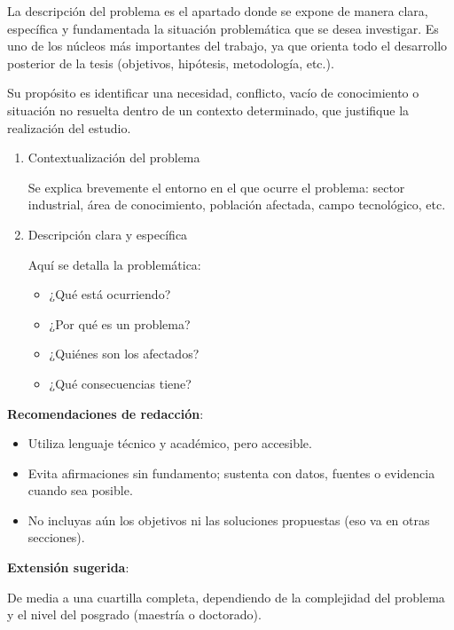 La descripción del problema es el apartado donde se expone de manera clara, específica y fundamentada la situación problemática que se desea investigar. Es uno de los núcleos más importantes del trabajo, ya que orienta todo el desarrollo posterior de la tesis (objetivos, hipótesis, metodología, etc.).

Su propósito es identificar una necesidad, conflicto, vacío de conocimiento o situación no resuelta dentro de un contexto determinado, que justifique la realización del estudio.

\begin{enumerate}
    \item Contextualización del problema

    Se explica brevemente el entorno en el que ocurre el problema: sector industrial, área de conocimiento, población afectada, campo tecnológico, etc.

    \item Descripción clara y específica
    
    Aquí se detalla la problemática:

    \begin{itemize}
        \item ¿Qué está ocurriendo?
        \item ¿Por qué es un problema?
        \item ¿Quiénes son los afectados?
        \item ¿Qué consecuencias tiene?
    \end{itemize}
\end{enumerate}

\textbf{Recomendaciones de redacción}:

\begin{itemize}
    \item Utiliza lenguaje técnico y académico, pero accesible.
    \item Evita afirmaciones sin fundamento; sustenta con datos, fuentes o evidencia cuando sea posible.
    \item No incluyas aún los objetivos ni las soluciones propuestas (eso va en otras secciones).
\end{itemize}

\textbf{Extensión sugerida}:

De media a una cuartilla completa, dependiendo de la complejidad del problema y el nivel del posgrado (maestría o doctorado).
